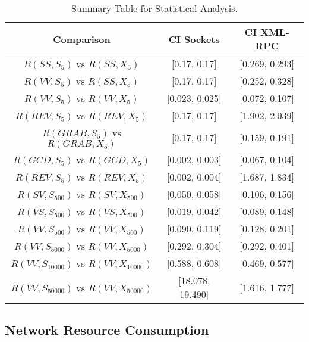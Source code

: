 \documentclass{sig-alternate}
\begin{document}
\begin{table*}[t]

\begin{center}
\begin{tabular}{|c||c|c|}

\hline
 {\bf Comparison}     &{\bf CI Sockets}     &{\bf CI XML-RPC} \\
\hline
 $R(SS,S_{5})$ vs $ R(SS,X_{5})$  & [0.17, 0.17]   & [0.269, 0.293] \\
\hline
 $R(VV,S_{5})$ vs $R(SS,X_{5})$   & [0.17, 0.17]   & [0.252, 0.328] \\
\hline
 $R(VV,S_{5})$ vs $R(VV,X_{5})$  & [0.023, 0.025]   & [0.072, 0.107] \\
\hline
 $R(REV,S_{5})$ vs $R(REV,X_{5})$  & [0.17, 0.17]   & [1.902, 2.039] \\
\hline
 $R(GRAB,S_{5})$ vs $R(GRAB,X_{5})$ & [0.17, 0.17]   & [0.159, 0.191] \\
\hline
 $R(GCD,S_{5})$ vs $R(GCD,X_{5})$  & [0.002, 0.003]   & [0.067, 0.104] \\
\hline
 $R(REV,S_{5})$ vs $R(REV,X_{5})$& [0.002, 0.004]   & [1.687, 1.834] \\
\hline
 $R(SV,S_{500})$ vs $R(SV,X_{500})$& [0.050, 0.058]   & [0.106, 0.156] \\
\hline
 $R(VS,S_{500})$ vs $R(VS,X_{500})$& [0.019, 0.042]   & [0.089, 0.148] \\
\hline
 $R(VV,S_{500})$ vs $R(VV,X_{500})$ & [0.090, 0.119]   & [0.128, 0.201] \\
\hline
 $R(VV,S_{5000})$ vs $R(VV,X_{5000})$   & [0.292, 0.304] & [0.292, 0.401] \\
\hline
 $ R(VV,S_{10000})$ vs $ R(VV,X_{10000})$   & [0.588, 0.608] & [0.469, 0.577] \\
\hline
 $ R(VV,S_{50000})$ vs $ R(VV,X_{50000})$  & [18.078, 19.490]  & [1.616, 1.777] \\

\hline
\end{tabular}
\end{center}

\vspace*{-.15in}

\caption{Summary Table for Statistical Analysis.}
\label{tab:XMLResults}

\vspace*{-.1in}

\end{table*}

\subsection{Network Resource Consumption}
\label{sec:space}
\end{document}

